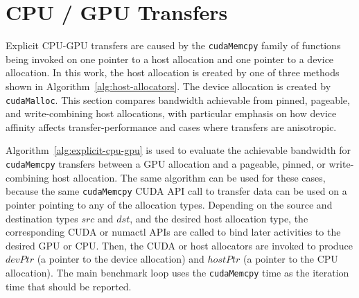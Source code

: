 \section{CPU / GPU Transfers}
\label{sec:explicit-cpu-gpu}

Explicit CPU-GPU transfers are caused by the \texttt{cudaMemcpy} family of functions being invoked on one pointer to a host allocation and one pointer to a device allocation.
In this work, the host allocation is created by one of three methods shown in Algorithm~\ref{alg:host-allocators}.
The device allocation is created by \texttt{cudaMalloc}.
This section compares bandwidth achievable from pinned, pageable, and write-combining host allocations, with particular emphasis on how device affinity affects transfer-performance and cases where transfers are anisotropic.

Algorithm~\ref{alg:explicit-cpu-gpu} is used to evaluate the achievable bandwidth for \texttt{cudaMemcpy} transfers between a GPU allocation and a pageable, pinned, or write-combining host allocation. 
The same algorithm can be used for these cases, because the same \texttt{cudaMemcpy} CUDA API call to transfer data can be used on a pointer pointing to any of the allocation types.
Depending on the source and destination types $src$ and $dst$, and the desired host allocation type, the corresponding CUDA or numactl APIs are called to bind later activities to the desired GPU or CPU.
Then, the CUDA or host allocators are invoked to produce $devPtr$ (a pointer to the device allocation) and $hostPtr$ (a pointer to the CPU allocation).
The main benchmark loop uses the \texttt{cudaMemcpy} time as the iteration time that should be reported.

